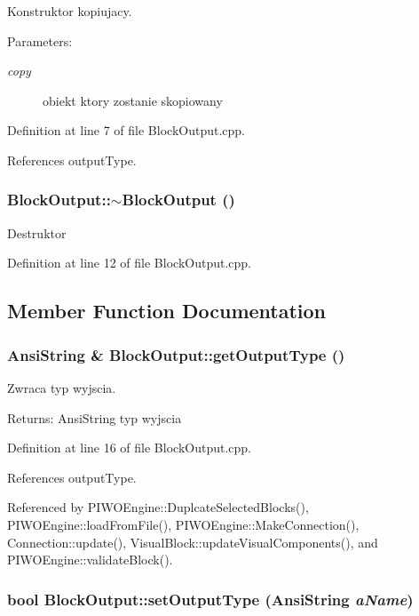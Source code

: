 Konstruktor kopiujacy. \begin{Desc}
\item[Parameters:]
\begin{description}
\item[{\em copy}]obiekt ktory zostanie skopiowany \end{description}
\end{Desc}


Definition at line 7 of file BlockOutput.cpp.

References outputType.\hypertarget{classBlockOutput_320d49ca840bb36f3f324730fc7af36a}{
\subsubsection[$\sim$BlockOutput]{\setlength{\rightskip}{0pt plus 5cm}BlockOutput::$\sim$BlockOutput ()}}
\label{classBlockOutput_320d49ca840bb36f3f324730fc7af36a}


Destruktor 

Definition at line 12 of file BlockOutput.cpp.

\subsection{Member Function Documentation}
\hypertarget{classBlockOutput_da94ac502aea6bf1f1786e248a9d1d99}{
\subsubsection[getOutputType]{\setlength{\rightskip}{0pt plus 5cm}AnsiString \& BlockOutput::getOutputType ()}}
\label{classBlockOutput_da94ac502aea6bf1f1786e248a9d1d99}


Zwraca typ wyjscia. \begin{Desc}
\item[Returns:]AnsiString typ wyjscia \end{Desc}


Definition at line 16 of file BlockOutput.cpp.

References outputType.

Referenced by PIWOEngine::DuplcateSelectedBlocks(), PIWOEngine::loadFromFile(), PIWOEngine::MakeConnection(), Connection::update(), VisualBlock::updateVisualComponents(), and PIWOEngine::validateBlock().\hypertarget{classBlockOutput_9cc345b9f987e8d17bf8df7a334de8cd}{
\subsubsection[setOutputType]{\setlength{\rightskip}{0pt plus 5cm}bool BlockOutput::setOutputType (AnsiString {\em aName})}}
\label{classBlockOutput_9cc345b9f987e8d17bf8df7a334de8cd}


